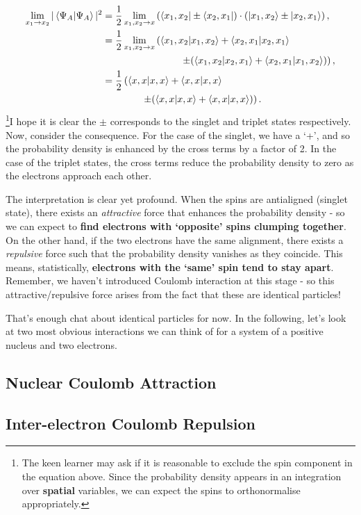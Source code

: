 \documentclass{article}
\numberwithin{equation}{section} %
\begin{document}
\begin{equation}
\begin{split}
\lim_{x_1\rightarrow x_2} \vert\braket{\Psi_A}\vert^2 &= \frac{1}{2}\lim_{x_1,x_2\rightarrow x} \left(\bra{x_1,x_2}\pm\bra{x_2,x_1} \right)\cdot \left(\ket{x_1,x_2}\pm\ket{x_2,x_1} \right),\\
&= \frac{1}{2}\lim_{x_1,x_2\rightarrow x} \left( \bra{x_1,x_2}\ket{x_1,x_2} + \bra{x_2,x_1}\ket{x_2,x_1} \right.\\
&\quad\quad\quad\quad\quad\quad\quad\quad\left. \pm ( \bra{x_1,x_2}\ket{x_2,x_1} + \bra{x_2,x_1}\ket{x_1,x_2} ) \right),\\
&= \frac{1}{2}\left( \bra{x,x}\ket{x,x} + \bra{x,x}\ket{x,x} \right.\\
&\quad\quad\quad\quad\left. \pm ( \bra{x,x}\ket{x,x} + \bra{x,x}\ket{x,x} ) \right).
\end{split}
\end{equation}
\footnote{The keen learner may ask if it is reasonable to exclude the spin component in the equation above. Since the probability density appears in an integration over \textbf{spatial} variables, we can expect the spins to orthonormalise appropriately.}I hope it is clear the $\pm$ corresponds to the singlet and triplet states respectively. Now, consider the consequence. For the case of the singlet, we have a `+', and so the probability density is enhanced by the cross terms by a factor of 2. In the case of the triplet states, the cross terms reduce the probability density to zero as the electrons approach each other.

The interpretation is clear yet profound. When the spins are antialigned (singlet state), there exists an \textit{attractive} force that enhances the probability density - so we can expect to \textbf{find electrons with `opposite' spins clumping together}. On the other hand, if the two electrons have the same alignment, there exists a \textit{repulsive} force such that the probability density vanishes as they coincide. This means, statistically, \textbf{electrons with the `same' spin tend to stay apart}. Remember, we haven't introduced Coulomb interaction at this stage - so this attractive/repulsive force arises from the fact that these are identical particles!

That's enough chat about identical particles for now. In the following, let's look at two most obvious interactions we can think of for a system of a positive nucleus and two electrons.

\subsection{Nuclear Coulomb Attraction}

\subsection{Inter-electron Coulomb Repulsion}




\newpage

\end{document}
